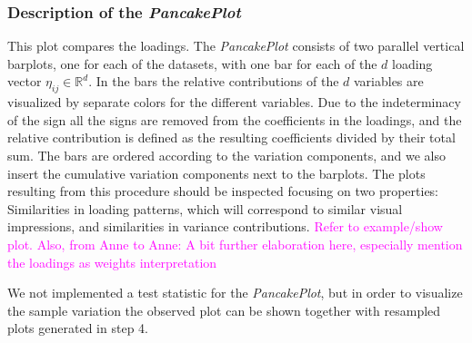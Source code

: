 \documentclass[titlepage,11pt,twoside]{article}
\newcommand{\hl}[1]{\textcolor{magenta}{#1}}
\newcommand{\RR}{\mathbb{R}}
\begin{document}

\subsubsection{Description of the \emph{PancakePlot}}
This plot compares the loadings. The \emph{PancakePlot} consists of two parallel vertical barplots, one for each of the datasets, with one bar for each of the $d$ loading vector $\eta_{ij} \in \RR^d$. In the bars the relative contributions of the $d$ variables are visualized by separate colors for the different variables. Due to the indeterminacy of the sign all the signs are removed from the coefficients in the loadings, and the relative contribution is defined as the resulting coefficients divided by their total sum. The bars are ordered according to the variation components, and we also insert the cumulative variation components next to the barplots. The plots resulting from this procedure should be inspected focusing on two properties: Similarities in loading patterns, which will correspond to similar visual impressions, and similarities in variance contributions.  \hl{Refer to example/show plot. Also, from Anne to Anne: A bit further elaboration here, especially mention the loadings as weights interpretation}

We not implemented a test statistic for the \emph{PancakePlot}, but in order to visualize the sample variation the observed plot can be shown together with resampled plots generated in step 4.

\end{document}
